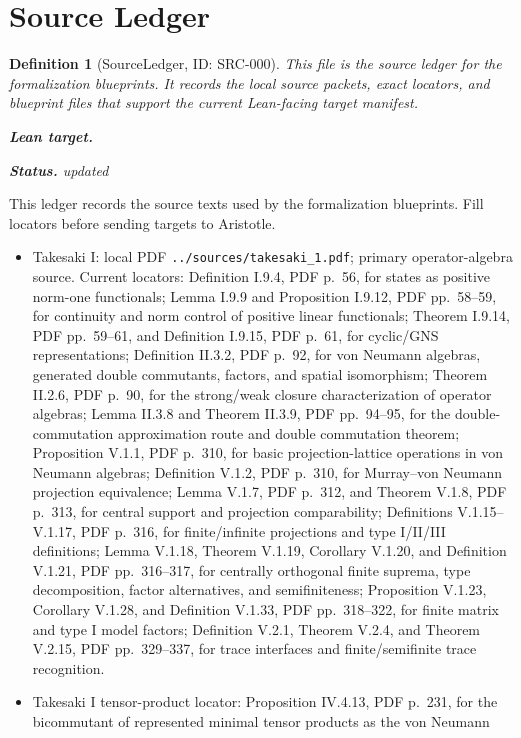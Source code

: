 \documentclass{article}
\newtheorem{definition}{Definition}
\newcommand{\lean}[1]{\par\noindent\textbf{Lean target.} \texttt{#1}}
\newcommand{\status}[1]{\par\noindent\textbf{Status.} #1}
\begin{document}
\section*{Source Ledger}

\begin{definition}[SourceLedger, ID: SRC-000]
This file is the source ledger for the formalization blueprints.  It records
the local source packets, exact locators, and blueprint files that support the
current Lean-facing target manifest.
\lean{}
\status{updated}
\end{definition}

This ledger records the source texts used by the formalization blueprints.
Fill locators before sending targets to Aristotle.

\begin{itemize}
\item Takesaki I: local PDF \texttt{../sources/takesaki\_1.pdf}; primary
operator-algebra source.  Current locators: Definition I.9.4, PDF p.~56, for
states as positive norm-one functionals; Lemma I.9.9 and Proposition I.9.12,
PDF pp.~58--59, for continuity and norm control of positive linear
functionals; Theorem I.9.14, PDF pp.~59--61, and Definition I.9.15, PDF
p.~61, for cyclic/GNS representations; Definition II.3.2, PDF p.~92, for
von Neumann algebras, generated double commutants, factors, and spatial
isomorphism; Theorem II.2.6, PDF p.~90, for the strong/weak closure
characterization of operator algebras; Lemma II.3.8 and Theorem II.3.9, PDF
pp.~94--95, for the double-commutation approximation route and double
commutation theorem; Proposition V.1.1, PDF p.~310, for basic
projection-lattice operations in von Neumann algebras; Definition V.1.2, PDF
p.~310, for Murray--von Neumann projection equivalence; Lemma V.1.7, PDF
p.~312, and Theorem V.1.8, PDF p.~313, for central support and projection
comparability;
Definitions V.1.15--V.1.17, PDF p.~316, for finite/infinite projections and
type I/II/III definitions; Lemma V.1.18, Theorem V.1.19, Corollary V.1.20,
and Definition V.1.21, PDF pp.~316--317, for centrally orthogonal finite
suprema, type decomposition, factor alternatives, and semifiniteness;
Proposition V.1.23, Corollary V.1.28, and Definition V.1.33,
PDF pp.~318--322, for finite matrix and type I model factors; Definition
V.2.1, Theorem V.2.4, and Theorem V.2.15, PDF pp.~329--337, for trace
interfaces and finite/semifinite trace recognition.
\item Takesaki I tensor-product locator: Proposition IV.4.13, PDF p.~231, for
the bicommutant of represented minimal tensor products as the von Neumann

\end{itemize}
\end{document}
